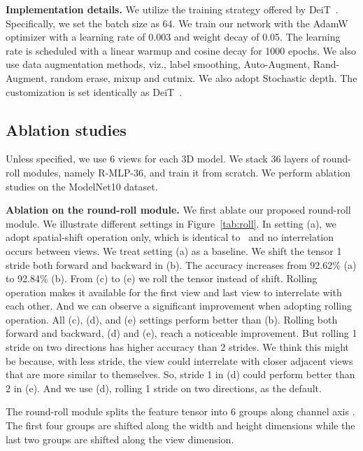 \documentclass[11pt]{article}
\begin{document}
\vspace{0.2in}\noindent\textbf{Implementation details.} We utilize the training strategy offered by DeiT~\citep{touvron2021training}. Specifically, we set the batch size as 64. We train our network with the AdamW optimizer with a learning rate of 0.003 and weight decay of 0.05. The learning rate is scheduled with a linear warmup and cosine decay for 1000 epochs. We also use data augmentation methods, viz., label smoothing, Auto-Augment, Rand-Augment, random erase, mixup and cutmix. We also adopt Stochastic depth. The customization is set identically as DeiT~\citep{touvron2021training}.


\subsection{Ablation studies}
Unless specified, we use 6 views for each 3D model. We stack 36 layers of round-roll modules, namely R-MLP-36, and train it from scratch. We perform ablation studies on the ModelNet10 dataset.

\vspace{0.2in}\noindent\textbf{Ablation on the round-roll module.} We first ablate our proposed round-roll module. We illustrate different settings in Figure~\ref{tab:roll}. In setting (a), we adopt spatial-shift operation only, which is identical to~\citet{yu2022s2mlp} and no interrelation occurs between views. We treat setting (a) as a baseline. We shift the tensor 1 stride both forward and backward in (b). The accuracy increases from 92.62\% (a) to 92.84\% (b). From (c) to (e) we roll the tensor instead of shift. Rolling operation makes it available for the first view and last view to interrelate with each other. And we can observe a significant improvement when adopting rolling operation. All (c), (d), and (e) settings perform better than (b). Rolling both forward and backward, (d) and (e), reach a noticeable improvement. But rolling 1 stride on two directions has higher accuracy than 2 strides. We think this might be because, with less stride, the view could interrelate with closer adjacent views that are more similar to themselves. So, stride 1 in (d) could perform better than 2 in (e). And we use (d), rolling 1 stride on two directions, as the default.

The round-roll module splits the feature tensor into 6 groups along channel axis . The first four groups are shifted along the width and height dimensions while the last two groups are shifted along the view dimension.
\end{document}
